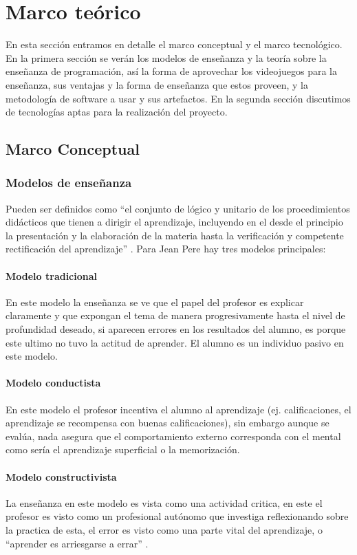 \chapter{Marco teórico}
En esta sección entramos en detalle el marco conceptual y el marco tecnológico. En la primera sección se verán los modelos de enseñanza y la teoría sobre la enseñanza de programación, así la forma de aprovechar los videojuegos para la enseñanza, sus ventajas y la forma de enseñanza que estos proveen, y la metodología de software a usar y sus artefactos. En la segunda sección discutimos de tecnologías aptas para la realización del proyecto.

\section{Marco Conceptual}

\subsection{Modelos de enseñanza}
Pueden ser definidos como \enquote{el conjunto de lógico y unitario de los procedimientos didácticos que tienen a dirigir el aprendizaje, incluyendo en el desde el principio la presentación y la elaboración de la materia hasta la verificación y competente rectificación del aprendizaje} \cite{metodos_ensenanza}. Para Jean Pere hay tres modelos principales:

\subsubsection{Modelo tradicional}
En este modelo la enseñanza se ve que el papel del profesor es explicar claramente y que expongan el tema de manera progresivamente hasta el nivel de profundidad deseado, si aparecen errores en los resultados del alumno, es porque este ultimo no  tuvo la actitud de aprender. El alumno es un individuo pasivo en este modelo.

\subsubsection{Modelo conductista}
En este modelo el profesor incentiva el alumno al aprendizaje (ej. calificaciones, el aprendizaje se recompensa con buenas calificaciones), sin embargo aunque se evalúa, nada asegura que el comportamiento externo corresponda con el mental como sería el aprendizaje superficial o la memorización.

\subsubsection{Modelo constructivista}
La enseñanza en este modelo es vista como una actividad critica, en este el profesor es visto como un profesional autónomo que investiga reflexionando sobre la practica de esta, el error es visto como una parte vital del aprendizaje, o \enquote{aprender es arriesgarse a errar} \cite{metodos_ensenanza}.

